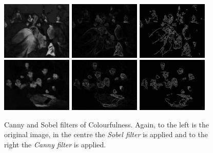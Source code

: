 \documentclass[11pt,a4paper,draft]{report}
\begin{document}
\begin{multicols}{2}
\begin{figure}[tbp]
\centering
\includegraphics[width=0.30\textwidth]{CS_caravaggio_1962_139_1}
\includegraphics[width=0.30\textwidth]{sobel_CS_caravaggio_1962_139_1}
\includegraphics[width=0.30\textwidth]{canny_CS_caravaggio_1962_139_1}
\includegraphics[width=0.30\textwidth]{CS_rembrandt_eu_464}
\includegraphics[width=0.30\textwidth]{sobel_CS_rembrandt_eu_464}
\includegraphics[width=0.30\textwidth]{canny_CS_rembrandt_eu_464}
\caption[Canny and Sobel filters of Colourfulness]{Canny and Sobel filters of
Colourfulness.  Again, to the left is the original image, in the centre the
\emph{Sobel filter} is applied and to the right the \emph{Canny filter} is
applied.}
\label{fig:cannysobelcs}
\end{figure}


\end{multicols}
\end{document}
